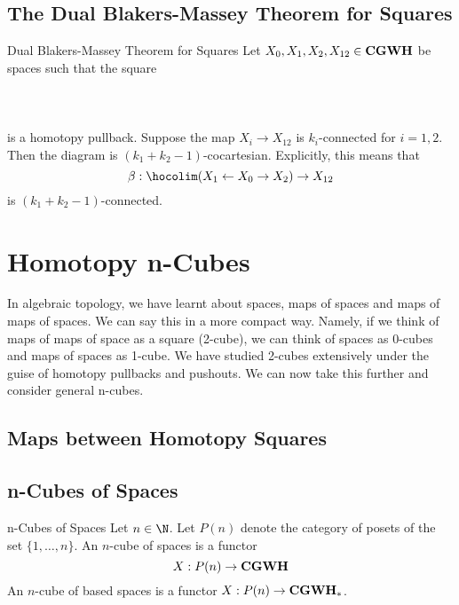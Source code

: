\documentclass[a4paper]{article}
\begin{document}
\subsection{The Dual Blakers-Massey Theorem for Squares}
\begin{thm}{Dual Blakers-Massey Theorem for Squares}{} Let $X_0,X_1,X_2,X_{12}\in\bold{CGWH}$ be spaces such that the square \\~\\
\\~\\
is a homotopy pullback. Suppose the map $X_i\to X_{12}$ is $k_i$-connected for $i=1,2$. Then the diagram is $(k_1+k_2-1)$-cocartesian. Explicitly, this means that $$\beta:\hocolim(X_1\leftarrow X_0\rightarrow X_2)\to X_{12}$$ is $(k_1+k_2-1)$-connected.
\end{thm}

\pagebreak
\section{Homotopy n-Cubes}
In algebraic topology, we have learnt about spaces, maps of spaces and maps of maps of spaces. We can say this in a more compact way. Namely, if we think of maps of maps of space as a square (2-cube), we can think of spaces as 0-cubes and maps of spaces as 1-cube. We have studied 2-cubes extensively under the guise of homotopy pullbacks and pushouts. We can now take this further and consider general n-cubes. 

\subsection{Maps between Homotopy Squares}

\subsection{n-Cubes of Spaces}
\begin{defn}{n-Cubes of Spaces}{} Let $n\in\N$. Let $P(n)$ denote the category of posets of the set $\{1,\dots,n\}$. An $n$-cube of spaces is a functor $$X:P(n)\to\bold{CGWH}$$ An $n$-cube of based spaces is a functor $X:P(n)\to\bold{CGWH}_\ast$. 
\end{defn}
\end{document}
